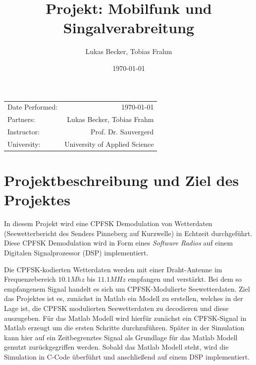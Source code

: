 \documentclass{article}
\title{Projekt: Mobilfunk und Singalverabreitung} %
\author{Lukas Becker, Tobias Frahm} %
\date{\today} %
\begin{document}
\maketitle %

\begin{center}
\begin{tabular}{l r}
Date Performed: & \today \\ %
Partners: & Lukas Becker, Tobias Frahm \\ %
Instructor: & Prof. Dr. Sauvergerd \\%
University: & University of Applied Science 
\end{tabular}
\end{center}

\begin{acronym}
\end{acronym}



\section{Projektbeschreibung und Ziel des Projektes}

In diesem Projekt wird eine \ac{CPFSK} Demodulation von Wetterdaten 
(Seewetterbericht des  Senders  Pinneberg  auf  Kurzwelle)  in  Echtzeit  durchgeführt. 
Diese  \ac{CPFSK} Demodulation  wird  in  Form  eines  \textit{Software  Radios}  auf  einem  
Digitalen Signalprozessor (DSP) implementiert. 

Die \ac{CPFSK}-kodierten Wetterdaten werden mit einer Draht-Antenne im Frequenzebereich
$10.1Mhz$ bis $11.1MHz$ empfangen und verstärkt. Bei dem so empfangenem Signal handelt es sich um 
\ac{CPFSK}-Modulierte Seewetterdaten. Ziel das Projektes ist es, zunächst in Matlab ein Modell zu erstellen, welches
in der Lage ist, die \ac{CPFSK} modulierten Seewetterdaten zu decodieren und diese auszugeben. 
Für das Matlab Modell wird hierfür zunächst ein \ac{CPFSK}-Signal in Matlab erzeugt um die ersten 
Schritte durchzuführen. Später in der Simulation kann hier auf ein Zeitbegrenztes Signal 
als Grundlage für das Matlab Modell genutzt zurückgegriffen werden. 
Sobald das Matlab Modell steht, wird die Simulation in C-Code überführt und anschließend 
auf einem DSP implementiert.
\end{document}
